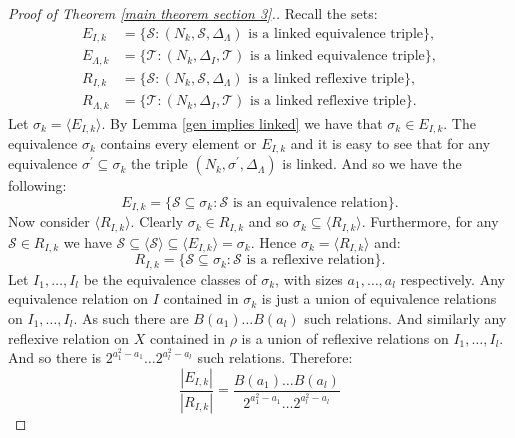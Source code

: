 \documentclass[10pt,a4paper]{amsart}
\begin{document}
\begin{proof}[Proof of Theorem \ref{main theorem section 3}.]
    Recall the sets:
    \begin{align*}
    E_{I,k} &= \{ \mathcal{S} : (N_k,\mathcal{S},\Delta_\Lambda) \text{ is a linked equivalence triple} \}, \\
    E_{\Lambda,k} &= \{ \mathcal{T} : (N_k,\Delta_I,\mathcal{T}) \text{ is a linked equivalence triple} \}, \\
    R_{I,k} &= \{ \mathcal{S} : (N_k,\mathcal{S},\Delta_\Lambda) \text{ is a linked reflexive triple} \}, \\
    R_{\Lambda,k} &= \{ \mathcal{T} : (N_k,\Delta_I,\mathcal{T}) \text{ is a linked reflexive triple} \}.
    \end{align*}
    Let $\sigma_k = \langle E_{I,k} \rangle$. By Lemma \ref{gen implies linked} we have that $\sigma_k \in E_{I,k}$.
    The equivalence $\sigma_k$ contains every element or $E_{I,k}$ and it is easy to see that for any equivalence $\sigma^\prime \subseteq \sigma_k$ the triple $(N_k,\sigma^\prime,\Delta_\Lambda)$ is linked. 
    And so we have the following:
    \begin{equation*}
        E_{I,k} = \{ \mathcal{S} \subseteq \sigma_k : \mathcal{S} \text{ is an equivalence relation} \}.
    \end{equation*}
    Now consider $\langle R_{I,k} \rangle$. Clearly $\sigma_k \in R_{I,k}$ and so $\sigma_k \subseteq \langle R_{I,k} \rangle$.
    Furthermore, for any $\mathcal{S} \in R_{I,k}$ we have $\mathcal{S} \subseteq \langle \mathcal{S} \rangle \subseteq \langle E_{I,k} \rangle = \sigma_k$.
    Hence $\sigma_k = \langle R_{I,k} \rangle$ and:
    \begin{equation*}
        R_{I,k} = \{\mathcal{S} \subseteq \sigma_k : \mathcal{S} \text{ is a reflexive relation} \}.
    \end{equation*}
    Let $I_1 , \dots , I_l$ be the equivalence classes of $\sigma_k$, with sizes $a_1 ,\ldots ,a_l$ respectively.
    Any equivalence relation on $I$ contained in $\sigma_k$ is just a union of equivalence relations on $I_1 , \dots ,I_l$.
    As such there are $B(a_1) \dots B(a_l)$ such relations.
    And similarly any reflexive relation on $X$ contained in $\rho$ is a union of reflexive relations on $I_1 , \dots , I_l$.
    And so there is $2^{a_1^2 - a_1} \dots 2^{a_l^2 - a_l}$ such relations.
    Therefore:
    \begin{equation}
        \label{I fraction form}
        \frac{|E_{I,k}|}{|R_{I,k}|} = \frac{B(a_1) \dots B(a_l)}{2^{a_1^2 - a_1} \dots 2^{a_l^2 - a_l}}

\end{equation}
\end{proof}
\end{document}
